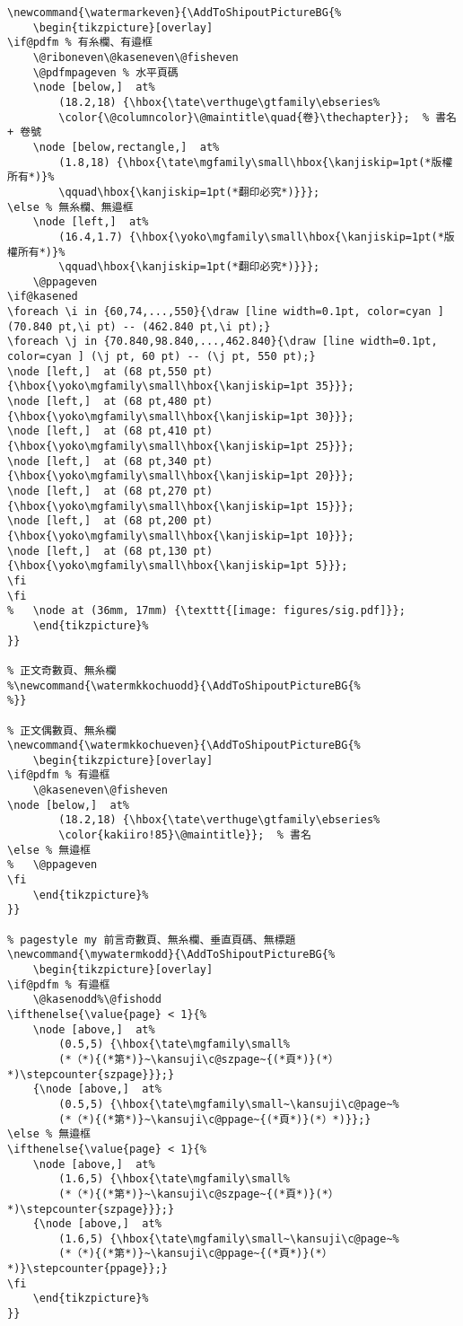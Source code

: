 \begin{lstlisting}[firstnumber=541]
% 正文偶數頁、糸欄
\newcommand{\watermarkeven}{\AddToShipoutPictureBG{%
	\begin{tikzpicture}[overlay]
\if@pdfm % 有糸欄、有邉框
	\@riboneven\@kaseneven\@fisheven
	\@pdfmpageven % 水平頁碼
	\node [below,]  at%
		(18.2,18) {\hbox{\tate\verthuge\gtfamily\ebseries%
		\color{\@columncolor}\@maintitle\quad{卷}\thechapter}};  % 書名+ 卷號
	\node [below,rectangle,]  at%
		(1.8,18) {\hbox{\tate\mgfamily\small\hbox{\kanjiskip=1pt(*版權所有*)}%
		\qquad\hbox{\kanjiskip=1pt(*翻印必究*)}}};
\else % 無糸欄、無邉框
	\node [left,]  at%
		(16.4,1.7) {\hbox{\yoko\mgfamily\small\hbox{\kanjiskip=1pt(*版權所有*)}%
		\qquad\hbox{\kanjiskip=1pt(*翻印必究*)}}};
	\@ppageven
\if@kasened
\foreach \i in {60,74,...,550}{\draw [line width=0.1pt, color=cyan ] (70.840 pt,\i pt) -- (462.840 pt,\i pt);}
\foreach \j in {70.840,98.840,...,462.840}{\draw [line width=0.1pt, color=cyan ] (\j pt, 60 pt) -- (\j pt, 550 pt);}
\node [left,]  at (68 pt,550 pt) {\hbox{\yoko\mgfamily\small\hbox{\kanjiskip=1pt 35}}};
\node [left,]  at (68 pt,480 pt) {\hbox{\yoko\mgfamily\small\hbox{\kanjiskip=1pt 30}}};
\node [left,]  at (68 pt,410 pt) {\hbox{\yoko\mgfamily\small\hbox{\kanjiskip=1pt 25}}};
\node [left,]  at (68 pt,340 pt) {\hbox{\yoko\mgfamily\small\hbox{\kanjiskip=1pt 20}}};
\node [left,]  at (68 pt,270 pt) {\hbox{\yoko\mgfamily\small\hbox{\kanjiskip=1pt 15}}};
\node [left,]  at (68 pt,200 pt) {\hbox{\yoko\mgfamily\small\hbox{\kanjiskip=1pt 10}}};
\node [left,]  at (68 pt,130 pt) {\hbox{\yoko\mgfamily\small\hbox{\kanjiskip=1pt 5}}};
\fi
\fi
%	\node at (36mm, 17mm) {\texttt{[image: figures/sig.pdf]}};
	\end{tikzpicture}%
}}

% 正文奇數頁、無糸欄
%\newcommand{\watermkkochuodd}{\AddToShipoutPictureBG{%
%}}

% 正文偶數頁、無糸欄
\newcommand{\watermkkochueven}{\AddToShipoutPictureBG{%
	\begin{tikzpicture}[overlay]
\if@pdfm % 有邉框
	\@kaseneven\@fisheven
\node [below,]  at%
		(18.2,18) {\hbox{\tate\verthuge\gtfamily\ebseries%
		\color{kakiiro!85}\@maintitle}};  % 書名
\else % 無邉框
%	\@ppageven
\fi
	\end{tikzpicture}%
}}

% pagestyle my 前言奇數頁、無糸欄、垂直頁碼、無標題
\newcommand{\mywatermkodd}{\AddToShipoutPictureBG{%
	\begin{tikzpicture}[overlay]
\if@pdfm % 有邉框
	\@kasenodd%\@fishodd
\ifthenelse{\value{page} < 1}{%
	\node [above,]  at%
		(0.5,5) {\hbox{\tate\mgfamily\small%
		(*（*){(*第*)}~\kansuji\c@szpage~{(*頁*)}(*）*)\stepcounter{szpage}}};}
	{\node [above,]  at%
		(0.5,5) {\hbox{\tate\mgfamily\small~\kansuji\c@page~%
		(*（*){(*第*)}~\kansuji\c@ppage~{(*頁*)}(*）*)}};}
\else % 無邉框
\ifthenelse{\value{page} < 1}{%
	\node [above,]  at%
		(1.6,5) {\hbox{\tate\mgfamily\small%
		(*（*){(*第*)}~\kansuji\c@szpage~{(*頁*)}(*）*)\stepcounter{szpage}}};}
	{\node [above,]  at%
		(1.6,5) {\hbox{\tate\mgfamily\small~\kansuji\c@page~%
		(*（*){(*第*)}~\kansuji\c@ppage~{(*頁*)}(*）*)}\stepcounter{ppage}};}
\fi
	\end{tikzpicture}%
}}


\end{lstlisting}
